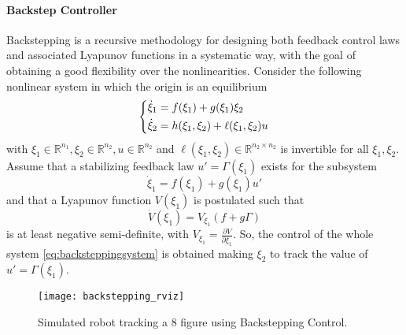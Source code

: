 \paragraph{Backstep Controller}
Backstepping is a recursive methodology for designing both feedback control laws and associated Lyapunov functions in a systematic way, with the goal of obtaining a good flexibility over the nonlinearities. Consider the following nonlinear system in which the origin is an equilibrium
\begin{equation}
\begin{dcases}
\dot{\xi}_1 = f(\xi_1) + g(\xi_1)\xi_2 \\
\dot{\xi}_2 = h(\xi_1,\xi_2) + \ell(\xi_1,\xi_2)u
\end{dcases}
\label{eq:backsteppingsystem}
\end{equation}
with $\xi_1\in\mathbb{R}^{n_1}, \xi_2\in\mathbb{R}^{n_2},u\in\mathbb{R}^{n_2}$ and $\ell(\xi_1,\xi_2)\in\mathbb{R}^{n_2 \times n_2}$ is invertible for all $\xi_1,\xi_2$. Assume that a stabilizing feedback law $u'=\Gamma(\xi_1)$ exists for the subsystem
\begin{equation}
\dot{\xi}_1 = f(\xi_1) + g(\xi_1)u'
\end{equation}
and that a Lyapunov function $V(\xi_1)$ is postulated such that
\begin{equation}
\dot{V}(\xi_1) = V_{\xi_1}(f + g\Gamma)
\end{equation}
is at least negative semi-definite, with $V_{\xi_1} = \frac{\partial{V}}{\partial{\xi_1}}$. So, the control of the whole system \eqref{eq:backsteppingsystem} is obtained making $\xi_2$ to track the value of $u'=\Gamma(\xi_1)$.

\begin{figure}[H]
	\centering
	\texttt{[image: backstepping\_rviz]}
	\caption{Simulated robot tracking a 8 figure using Backstepping Control.}
\end{figure}

